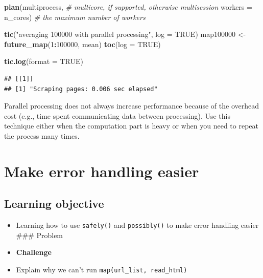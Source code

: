 \documentclass[
]{book}
\newenvironment{Shaded}{\begin{snugshade}}{\end{snugshade}}
\newcommand{\AttributeTok}[1]{\textcolor[rgb]{0.13,0.29,0.53}{#1}}
\newcommand{\CommentTok}[1]{\textcolor[rgb]{0.56,0.35,0.01}{\textit{#1}}}
\newcommand{\ConstantTok}[1]{\textcolor[rgb]{0.56,0.35,0.01}{#1}}
\newcommand{\DecValTok}[1]{\textcolor[rgb]{0.00,0.00,0.81}{#1}}
\newcommand{\FunctionTok}[1]{\textcolor[rgb]{0.13,0.29,0.53}{\textbf{#1}}}
\newcommand{\NormalTok}[1]{#1}
\newcommand{\OtherTok}[1]{\textcolor[rgb]{0.56,0.35,0.01}{#1}}
\newcommand{\SpecialCharTok}[1]{\textcolor[rgb]{0.81,0.36,0.00}{\textbf{#1}}}
\newcommand{\StringTok}[1]{\textcolor[rgb]{0.31,0.60,0.02}{#1}}
\begin{document}
\begin{Shaded}
\begin{Highlighting}[]
\FunctionTok{plan}\NormalTok{(multiprocess, }\CommentTok{\# multicore, if supported, otherwise multisession}
     \AttributeTok{workers =}\NormalTok{ n\_cores) }\CommentTok{\# the maximum number of workers}

\FunctionTok{tic}\NormalTok{(}\StringTok{"averaging 100000 with parallel processing"}\NormalTok{, }\AttributeTok{log =} \ConstantTok{TRUE}\NormalTok{)}
\NormalTok{map100000 }\OtherTok{\textless{}{-}} \FunctionTok{future\_map}\NormalTok{(}\DecValTok{1}\SpecialCharTok{:}\DecValTok{100000}\NormalTok{, mean)}
\FunctionTok{toc}\NormalTok{(}\AttributeTok{log =} \ConstantTok{TRUE}\NormalTok{)}
\end{Highlighting}
\end{Shaded}

\begin{Shaded}
\begin{Highlighting}[]
\FunctionTok{tic.log}\NormalTok{(}\AttributeTok{format =} \ConstantTok{TRUE}\NormalTok{)}
\end{Highlighting}
\end{Shaded}

\begin{verbatim}
## [[1]]
## [1] "Scraping pages: 0.006 sec elapsed"
\end{verbatim}

Parallel processing does not always increase performance because of the overhead cost (e.g., time spent communicating data between processing). Use this technique either when the computation part is heavy or when you need to repeat the process many times.

\section{Make error handling easier}\label{robustness}

\subsection{Learning objective}\label{learning-objective}

\begin{itemize}
\item
  Learning how to use \texttt{safely()} and \texttt{possibly()} to make error handling easier
  \#\#\# Problem
\item
  \textbf{Challenge}
\item
  Explain why we can't run \texttt{map(url\_list,\ read\_html)}
\end{itemize}
\end{document}
